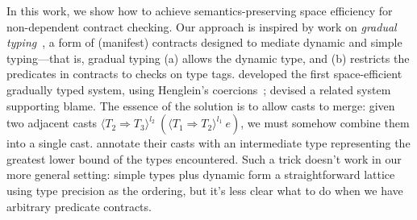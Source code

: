 \documentclass[9pt]{extarticle}
\newcommand{\ottnt}[1]{\mathit{#1}}
\begin{document}
In this work, we show how to achieve semantics-preserving space
efficiency for non-dependent contract checking.
Our approach is inspired by work on \textit{gradual
  typing}~\cite{Siek06gradual}, a form of (manifest) contracts
designed to mediate dynamic and simple typing---that is, gradual typing
(a) allows the dynamic type, and (b) restricts the predicates in
contracts to checks on type tags.
 developed the first space-efficient gradually
typed system, using Henglein's coercions~\cite{Henglein94dynamic};
\citet{Siek10threesomes} devised a related system supporting blame.
The essence of the solution is to allow casts to merge: given two
adjacent casts $ \langle  \ottnt{T_{{\mathrm{2}}}}  \mathord{ \overset{    }{\Rightarrow} }  \ottnt{T_{{\mathrm{3}}}}  \rangle^{ \ottnt{l_{{\mathrm{2}}}} } ~   (  \langle  \ottnt{T_{{\mathrm{1}}}}  \mathord{ \overset{    }{\Rightarrow} }  \ottnt{T_{{\mathrm{2}}}}  \rangle^{ \ottnt{l_{{\mathrm{1}}}} } ~  \ottnt{e}  )  $, we
must somehow combine them into a single cast.
 annotate their casts with an
intermediate type representing the greatest lower bound of the types
encountered.
Such a trick doesn't work in our more general setting: simple types
plus dynamic form a straightforward lattice using type precision as
the ordering, but it's less clear what to do when we have arbitrary
predicate contracts.
\end{document}
